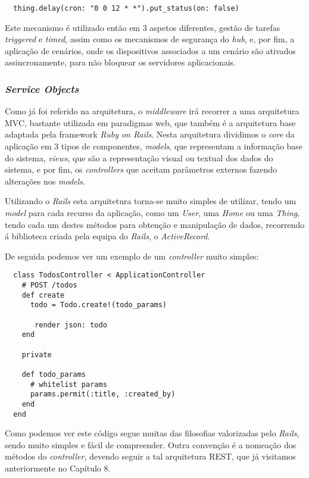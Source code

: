 \begin{verbatim}
  thing.delay(cron: "0 0 12 * *").put_status(on: false)
\end{verbatim}

Este mecanismo é utilizado então em 3 aspetos diferentes, gestão de tarefas \textit{triggered} e \textit{timed}, assim como os mecanismos de segurança do \textit{hub}, e, por fim, a aplicação de cenários, onde os dispositivos associados a um cenário são ativados assincronamente, para não bloquear os servidores aplicacionais.

\subsubsection{\textit{Service Objects}}

Como já foi referido na arquitetura, o \textit{middleware} irá recorrer a uma arquitetura MVC, bastante utilizada em paradigmas web, que também é a arquitetura base adaptada pela framework \textit{Ruby on Rails}. Nesta arquitetura dividimos o \textit{core} da aplicação em 3 tipos de componentes, \textit{models}, que representam a informação base do sistema, \textit{views}, que são a representação visual ou textual dos dados do sistema, e por fim, os \textit{controllers} que aceitam parâmetros externos fazendo alterações nos \textit{models}.

Utilizando o \textit{Rails} esta arquitetura torna-se muito simples de utilizar, tendo um \textit{model} para cada recurso da aplicação, como um \textit{User}, uma \textit{Home} ou uma \textit{Thing}, tendo cada um destes métodos para obtenção e manipulação de dados, recorrendo á biblioteca criada pela equipa do \textit{Rails}, o \textit{ActiveRecord}.

De seguida podemos ver um exemplo de um \textit{controller} muito simples:

\begin{verbatim}
  class TodosController < ApplicationController
    # POST /todos
    def create
      todo = Todo.create!(todo_params)
        
       render json: todo
    end
    
    private
    
    def todo_params
      # whitelist params
      params.permit(:title, :created_by)
    end
  end
\end{verbatim}

Como podemos ver este código segue muitas das filosofias valorizadas pelo \textit{Rails}, sendo muito simples e fácil de compreender. Outra convenção é a nomeação dos métodos do \textit{controller}, devendo seguir a tal arquitetura REST, que já visitamos anteriormente no Capítulo 8.

